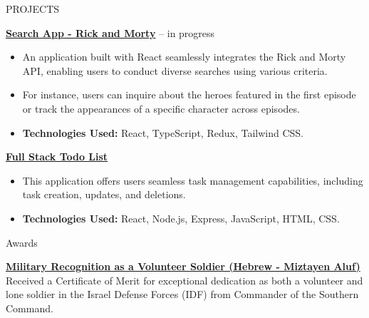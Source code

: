 \documentclass{resume}
\begin{document}
\vspace{15pt}
\begin{rSection}{PROJECTS}

\textbf{\href{https://github.com/Asnvir/React-TS-RickMorty}{Search App - Rick and Morty}} – in progress

\begin{itemize}
    \item An application built with React seamlessly integrates the Rick and Morty API, enabling users to conduct diverse searches using various criteria.
    \item For instance, users can inquire about the heroes featured in the first episode or track the appearances of a specific character across episodes.
    \item \textbf{Technologies Used:} React, TypeScript, Redux, Tailwind CSS.

\end{itemize}

\vspace{0.25em} %

\textbf{{\href{https://github.com/Asnvir/todo-react-app}{Full Stack Todo List }}}

\begin{itemize}
    \item This application offers users seamless task management capabilities, including task creation, updates, and deletions.
    \item \textbf{Technologies Used:} React, Node.js, Express, JavaScript, HTML, CSS.
\end{itemize}


\end{rSection}
\vspace{15pt}
\begin{rSection}{Awards}
\vspace{-1.25em}
\item \textbf{\href{https://drive.google.com/file/d/1QWiVud-gSK4n_YLskh-mxVn0zGRxDvHW/view?usp=sharing}{Military Recognition as a Volunteer Soldier (Hebrew - Miztayen Aluf)}}
\\Received a Certificate of Merit for exceptional dedication as both a volunteer and lone soldier in the Israel Defense Forces (IDF) from Commander of the Southern Command.
\end{rSection}
\end{document}
